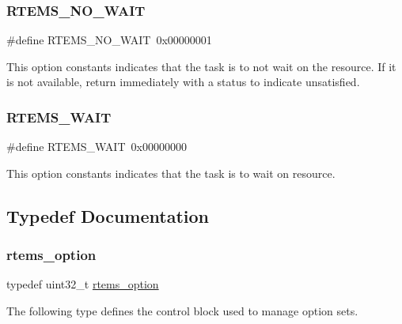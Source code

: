 \subsubsection{\texorpdfstring{RTEMS\_NO\_WAIT}{RTEMS\_NO\_WAIT}}
{\footnotesize\ttfamily \#define R\+T\+E\+M\+S\+\_\+\+N\+O\+\_\+\+W\+A\+IT~0x00000001}

This option constants indicates that the task is to not wait on the resource. If it is not available, return immediately with a status to indicate unsatisfied. \mbox{\label{group__ClassicOptions_ga6c344518194b529f32555ad5a9f85613}} 
\subsubsection{\texorpdfstring{RTEMS\_WAIT}{RTEMS\_WAIT}}
{\footnotesize\ttfamily \#define R\+T\+E\+M\+S\+\_\+\+W\+A\+IT~0x00000000}

This option constants indicates that the task is to wait on resource. 

\subsection{Typedef Documentation}
\mbox{\label{group__ClassicOptions_gad26685eb0e60a9650082935c31920e29}} 
\subsubsection{\texorpdfstring{rtems\_option}{rtems\_option}}
{\footnotesize\ttfamily typedef uint32\+\_\+t \mbox{\hyperlink{group__ClassicOptions_gad26685eb0e60a9650082935c31920e29}{rtems\+\_\+option}}}

The following type defines the control block used to manage option sets. 